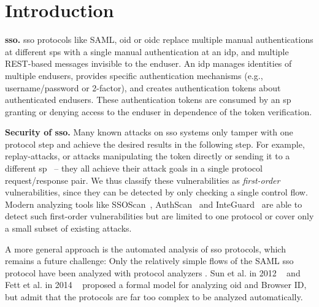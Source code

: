 \documentclass[conference,compsoc]{IEEEtran}
\renewcommand*{\paragraph}[1]{\vspace{2mm}\noindent\textbf{#1.}}
\begin{document}
\glsresetall{}
\section{Introduction}
\label{sec:intro}



\paragraph{\gls{sso}}
\gls{sso} protocols like SAML, \gls{oid} or \gls{oidc} replace multiple manual authentications at different \glspl{sp} with a single manual authentication at an \gls{idp}, and multiple REST-based messages invisible to the \gls{enduser}.
An \gls{idp} manages identities of multiple \gls{enduser}s, provides specific authentication mechanisms (e.g., username/password or 2-factor), and creates authentication tokens about authenticated \gls{enduser}s.
These authentication tokens are consumed by an \gls{sp} granting or denying access to the \gls{enduser} in dependence of the token verification. 

\paragraph{Security of \gls{sso}}
Many known attacks on \gls{sso} systems only tamper with one protocol step and achieve the desired results in the following step.
For example, replay-attacks, or attacks manipulating the token directly or sending it to a different \gls{sp}~\cite{grossSAML,saas_ccsw14,SoMaScKaJeSAML12,microsoft} -- they all achieve their attack goals in a single protocol request/response pair.
We thus classify these vulnerabilities as {\em first-order} vulnerabilities, since they can be detected by only checking a single control flow.
Modern analyzing tools like SSOScan~\cite{ssoscan}, AuthScan~\cite{authscan} and InteGuard~\cite{integuard} are able to detect such first-order vulnerabilities but are limited to one protocol or cover only a small subset of existing attacks.

A more general approach is the automated analysis of \gls{sso} protocols, which remains a future challenge: Only the relatively simple flows of the SAML \gls{sso} protocol have been analyzed with protocol analyzers \cite{grossSAML}. Sun et al. in 2012 ~\cite{journals/compsec/SunHB12} and Fett et al. in 2014 ~\cite{FettKuestersSchmitz-SP-2014} proposed a formal model for analyzing \gls{oid} and Browser ID, but admit that the protocols are far too complex to be analyzed automatically.
\end{document}
